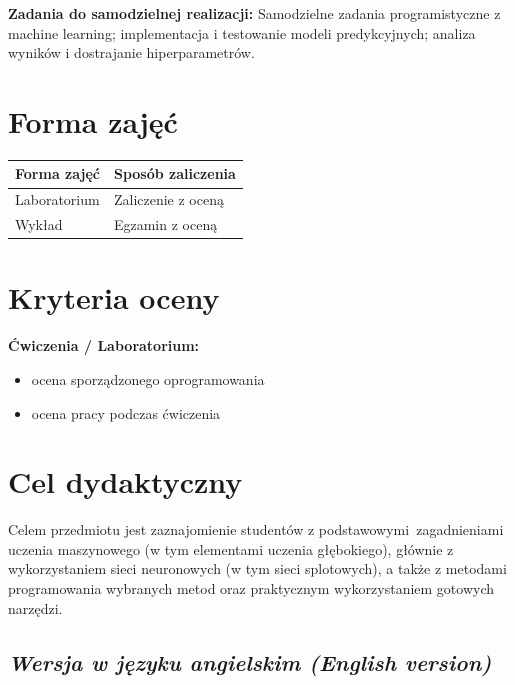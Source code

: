\documentclass[12pt, a4paper]{article}
\newcommand{\thdrule}{\noalign{\global\setlength{\extrarowheight}{0pt}}}
\newcommand{\thdend}{\noalign{\global\setlength{\extrarowheight}{3pt}}}
\begin{document}
\vspace{4pt}
\noindent\textbf{Zadania do samodzielnej realizacji:} Samodzielne zadania programistyczne z machine learning; implementacja i testowanie modeli predykcyjnych; analiza wyników i dostrajanie hiperparametrów.

\section{Forma zajęć}

\begin{center}
{\scriptsize
\begin{tabular}{m{5cm}m{8cm}}
\thdrule\toprule
\rowcolor{pjatkRed} {\color{white}\textbf{Forma zajęć}} & {\color{white}\textbf{Sposób zaliczenia}} \\
\midrule\thdend
  \rowcolor{tableRowLight} Laboratorium & Zaliczenie z oceną \\
  \rowcolor{tableRowAlt} Wykład & Egzamin z oceną \\
\bottomrule
\end{tabular}}
\end{center}

\section{Kryteria oceny}

\textbf{Ćwiczenia / Laboratorium:}
\begin{itemize}
  \item ocena sporządzonego oprogramowania
  \item ocena pracy podczas ćwiczenia
\end{itemize}


\section{Cel dydaktyczny}

Celem przedmiotu jest zaznajomienie studentów z podstawowymi zagadnieniami uczenia maszynowego (w tym elementami uczenia głębokiego), głównie z wykorzystaniem sieci neuronowych (w tym sieci splotowych), a także z metodami programowania wybranych metod oraz praktycznym wykorzystaniem gotowych narzędzi.

\subsection*{\textit{Wersja w języku angielskim (English version)}}
\end{document}

